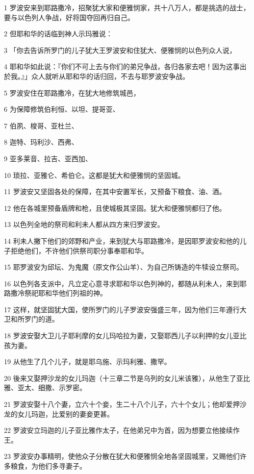 \par 1 罗波安来到耶路撒冷，招聚犹大家和便雅悯家，共十八万人，都是挑选的战士，要与以色列人争战，好将国夺回再归自己。
\par 2 但耶和华的话临到神人示玛雅说：
\par 3 「你去告诉所罗门的儿子犹大王罗波安和住犹大、便雅悯的以色列众人说，
\par 4 耶和华如此说：『你们不可上去与你们的弟兄争战，各归各家去吧！因为这事出於我。』」众人就听从耶和华的话归回，不去与耶罗波安争战。
\par 5 罗波安住在耶路撒冷，在犹大地修筑城邑，
\par 6 为保障修筑伯利恒、以坦、提哥亚、
\par 7 伯夙、梭哥、亚杜兰、
\par 8 迦特、玛利沙、西弗、
\par 9 亚多莱音、拉吉、亚西加、
\par 10 琐拉、亚雅仑、希伯仑。这都是犹大和便雅悯的坚固城。
\par 11 罗波安又坚固各处的保障，在其中安置军长，又预备下粮食、油、酒。
\par 12 他在各城里预备盾牌和枪，且使城极其坚固。犹大和便雅悯都归了他。
\par 13 以色列全地的祭司和利未人都从四方来归罗波安。
\par 14 利未人撇下他们的郊野和产业，来到犹大与耶路撒冷，是因耶罗波安和他的儿子拒绝他们，不许他们供祭司职分事奉耶和华。
\par 15 耶罗波安为邱坛、为鬼魔（原文作公山羊）、为自己所铸造的牛犊设立祭司。
\par 16 以色列各支派中，凡立定心意寻求耶和华以色列神的，都随从利未人，来到耶路撒冷祭祀耶和华他们列祖的神。
\par 17 这样，就坚固犹大国，使所罗门的儿子罗波安强盛三年，因为他们三年遵行大卫和所罗门的道。
\par 18 罗波安娶大卫儿子耶利摩的女儿玛哈拉为妻，又娶耶西儿子以利押的女儿亚比孩为妻。
\par 19 从他生了几个儿子，就是耶乌施、示玛利雅、撒罕。
\par 20 後来又娶押沙龙的女儿玛迦（十三章二节是乌列的女儿米该雅），从他生了亚比雅、亚太、细撒、示罗密。
\par 21 罗波安娶十八个妻，立六十个妾，生二十八个儿子，六十个女儿；他却爱押沙龙的女儿玛迦，比爱别的妻妾更甚。
\par 22 罗波安立玛迦的儿子亚比雅作太子，在他弟兄中为首，因为想要立他接续作王。
\par 23 罗波安办事精明，使他众子分散在犹大和便雅悯全地各坚固城里，又赐他们许多粮食，为他们多寻妻子。

